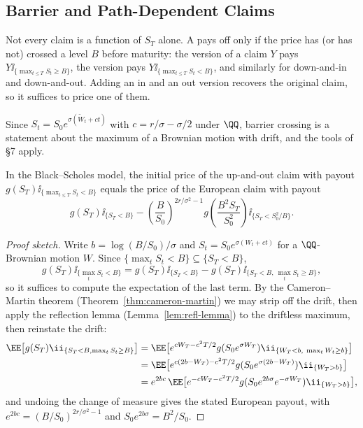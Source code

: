 \subsection{Barrier and Path-Dependent Claims}

Not every claim is a function of $S_T$ alone. A  pays off only if the price has (or has not) crossed a level $B$ before maturity: the  version of a claim $Y$ pays $Y\ii_{\{\max_{t\leq T}S_t\geq B\}}$, the  version pays $Y\ii_{\{\max_{t\leq T}S_t < B\}}$, and similarly for down-and-in and down-and-out. Adding an in and an out version recovers the original claim, so it suffices to price one of them.

Since $S_t = S_0e^{\sigma(\tilde W_t + ct)}$ with $c = r/\sigma - \sigma/2$ under $\QQ$, barrier crossing is a statement about the maximum of a Brownian motion with drift, and the tools of \S7 apply.

\begin{proposition}
	In the Black--Scholes model, the initial price of the up-and-out claim with payout $g(S_T)\ii_{\{\max_{t\leq T}S_t < B\}}$ equals the price of the European claim with payout
	$$
	g(S_T)\ii_{\{S_T<B\}} - \left(\frac{B}{S_0}\right)^{2r/\sigma^2 - 1}g\!\left(\frac{B^2S_T}{S_0^2}\right)\ii_{\{S_T < S_0^2/B\}}.
	$$
\end{proposition}

\begin{proof}[Proof sketch]
	Write $b = \log(B/S_0)/\sigma$ and $S_t = S_0e^{\sigma(W_t + ct)}$ for a $\QQ$-Brownian motion $W$. Since $\{\max_t S_t < B\}\subseteq\{S_T<B\}$,
	$$
	g(S_T)\ii_{\{\max_t S_t<B\}} = g(S_T)\ii_{\{S_T<B\}} - g(S_T)\ii_{\{S_T<B,\ \max_tS_t\geq B\}},
	$$
	so it suffices to compute the expectation of the last term. By the Cameron--Martin theorem (Theorem~\ref{thm:cameron-martin}) we may strip off the drift, then apply the reflection lemma (Lemma~\ref{lem:refl-lemma}) to the driftless maximum, then reinstate the drift:
	\begin{align*}
		\EE\big[g(S_T)\ii_{\{S_T<B,\max_tS_t\geq B\}}\big] &= \EE\big[e^{cW_T - c^2T/2}g(S_0e^{\sigma W_T})\ii_{\{W_T<b,\ \max_tW_t\geq b\}}\big]\\
		&= \EE\big[e^{c(2b-W_T)-c^2T/2}g(S_0e^{\sigma(2b-W_T)})\ii_{\{W_T>b\}}\big]\\
		&= e^{2bc}\,\EE\big[e^{-cW_T-c^2T/2}g(S_0e^{2b\sigma}e^{-\sigma W_T})\ii_{\{W_T>b\}}\big],
	\end{align*}
	and undoing the change of measure gives the stated European payout, with $e^{2bc} = (B/S_0)^{2r/\sigma^2-1}$ and $S_0e^{2b\sigma} = B^2/S_0$.
\end{proof}

